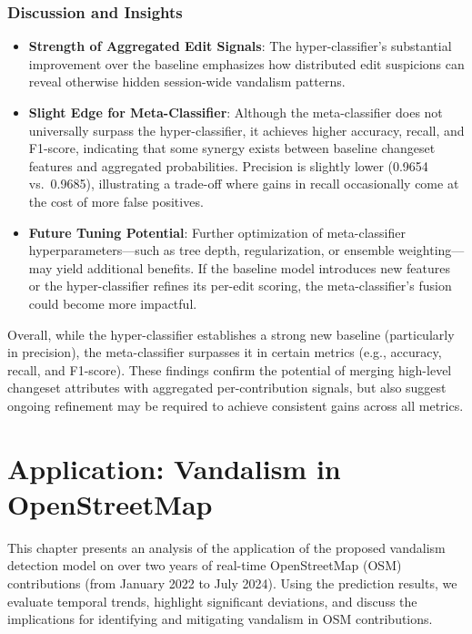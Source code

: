 \documentclass[
    13pt, %
    a4paper, %
    listof=totoc, %
    bibliography=totoc, %
    index=totoc, %
    headsepline
]{scrreprt}
\begin{document}
\subsection{Discussion and Insights}

\begin{itemize}
    \item \textbf{Strength of Aggregated Edit Signals}:
    The hyper-classifier’s substantial improvement over the baseline emphasizes how distributed edit suspicions can reveal otherwise hidden session-wide vandalism patterns.
    \item \textbf{Slight Edge for Meta-Classifier}:
    Although the meta-classifier does not universally surpass the hyper-classifier, it achieves higher accuracy, recall, and F1-score, indicating that some synergy exists between baseline changeset features and aggregated probabilities. Precision is slightly lower (0.9654 vs.\ 0.9685), illustrating a trade-off where gains in recall occasionally come at the cost of more false positives.
    \item \textbf{Future Tuning Potential}:
    Further optimization of meta-classifier hyperparameters—such as tree depth, regularization, or ensemble weighting—may yield additional benefits. If the baseline model introduces new features or the hyper-classifier refines its per-edit scoring, the meta-classifier’s fusion could become more impactful.
\end{itemize}

Overall, while the hyper-classifier establishes a strong new baseline (particularly in precision), the meta-classifier surpasses it in certain metrics (e.g., accuracy, recall, and F1-score). These findings confirm the potential of merging high-level changeset attributes with aggregated per-contribution signals, but also suggest ongoing refinement may be required to achieve consistent gains across all metrics.




\chapter{Application: Vandalism in OpenStreetMap} \label{chapter:application}

This chapter presents an analysis of the application of the proposed vandalism detection model on over two years of real-time OpenStreetMap (OSM) contributions (from January 2022 to July 2024). Using the prediction results, we evaluate temporal trends, highlight significant deviations, and discuss the implications for identifying and mitigating vandalism in OSM contributions.
\end{document}
